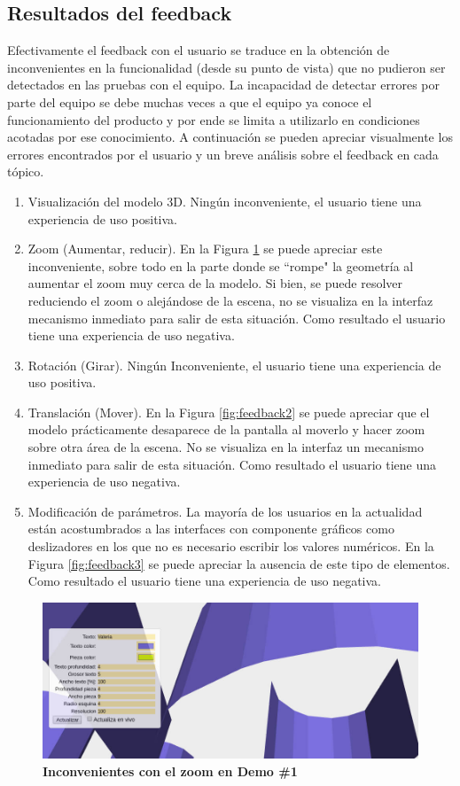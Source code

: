 \subsection{Resultados del feedback}
Efectivamente el feedback con el usuario se traduce en la obtención de inconvenientes en la funcionalidad (desde su punto de vista) que no pudieron ser detectados en las pruebas con el equipo. La incapacidad de detectar errores por parte del equipo se debe muchas veces a que el equipo ya conoce el funcionamiento del producto y por ende se limita a utilizarlo en condiciones acotadas por ese conocimiento. A continuación se pueden apreciar visualmente los errores encontrados por el usuario y un breve análisis sobre el feedback en cada tópico.

\begin{enumerate}
    \item Visualización del modelo 3D. Ningún inconveniente, el usuario tiene una experiencia de uso positiva.
    \item Zoom (Aumentar, reducir). En la Figura \ref{fig:feedback1} se puede apreciar este inconveniente, sobre todo en la parte donde se ``rompe" la geometría al aumentar el zoom muy cerca de la modelo. Si bien, se puede resolver reduciendo el zoom o alejándose de la escena, no se visualiza en la interfaz mecanismo inmediato para salir de esta situación. Como resultado el usuario tiene una experiencia de uso negativa.
    \item Rotación (Girar). Ningún Inconveniente, el usuario tiene una experiencia de uso positiva.
    \item Translación (Mover). En la Figura \ref{fig:feedback2} se puede apreciar que el modelo prácticamente desaparece de la pantalla al moverlo y hacer zoom sobre otra área de la escena. No se visualiza en la interfaz un mecanismo inmediato para salir de esta situación. Como resultado el usuario tiene una experiencia de uso negativa.
    \item Modificación de parámetros. La mayoría de los usuarios en la actualidad están acostumbrados a las interfaces con componente gráficos como deslizadores en los que no es necesario escribir los valores numéricos. En la Figura \ref{fig:feedback3} se puede apreciar la ausencia de este tipo de elementos. Como resultado el usuario tiene una experiencia de uso negativa.
\end{enumerate}


\begin{figure}[h]
    \includegraphics[width=14cm]{Img/Desarrollo/feedback2.jpg}
    \centering
    \caption{\textbf{ \footnotesize{Inconvenientes con el zoom en Demo \#1}}}
     \label{fig:feedback1}
\end{figure}

